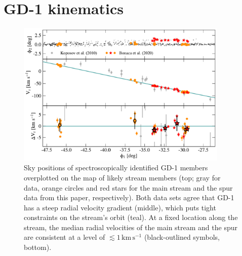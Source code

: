 \documentclass[twocolumn]{aastex63}
\newcommand{\kms}{\ensuremath{\textrm{km}\,\textrm{s}^{-1}}}
\newcommand{\feh}{\ensuremath{\textrm{[Fe/H]}}}
\newcommand{\afe}{\ensuremath{\textrm{[$\alpha$/Fe]}}}
\begin{document}


\section{GD-1 kinematics}
\label{sec:kinematics}

\begin{figure}
\begin{center}
\includegraphics[width=0.9\textwidth]{gd1_kinematics.pdf}
\end{center}
\caption{Sky positions of spectroscopically identified GD-1 members overplotted on the map of likely stream members (top; gray for \citet{koposov2010} data, orange circles and red stars for the main stream and the spur data from this paper, respectively).
Both data sets agree that GD-1 has a steep radial velocity gradient (middle), which puts tight constraints on the stream's orbit (teal).
At a fixed location along the stream, the median radial velocities of the main stream and the spur are consistent at a level of $\lesssim1\,\kms$ (black-outlined symbols, bottom).
}
\label{fig:vr}
\end{figure}
\end{document}
